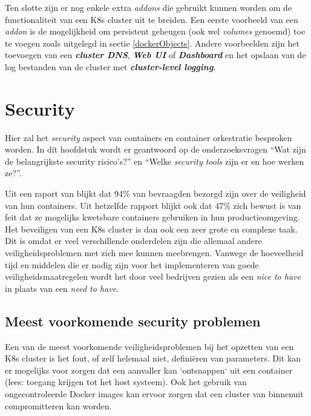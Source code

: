 Ten slotte zijn er nog enkele extra \textit{addons} die gebruikt kunnen worden om de functionaliteit van een K8s cluster uit te breiden. Een eerste voorbeeld van een \textit{addon} is de mogelijkheid om persistent geheugen (ook wel \textit{volumes} genoemd) toe te voegen zoals uitgelegd in sectie \ref{dockerObjects}. Andere voorbeelden zijn het toevoegen van een \textbf{\textit{cluster DNS}}, \textbf{\textit{Web UI}} of \textbf{\textit{Dashboard}} en het opslaan van de log bestanden van de cluster met \textbf{\textit{cluster-level logging}}.
\clearpage

\section{Security}

Hier zal het \textit{security} aspect van containers en container orkestratie besproken worden. In dit hoofdstuk wordt er geantwoord op de onderzoeksvragen ``Wat zijn de belangrijkste security risico's?'' en ``Welke \textit{security tools} zijn er en hoe werken ze?''.

Uit een raport van \textcite{Tripwire2019} blijkt dat 94\% van bevraagden bezorgd zijn over de veiligheid van hun containers. Uit hetzelfde rapport blijkt ook dat 47\% zich bewust is van feit dat ze mogelijks kwetsbare containers gebruiken in hun productieomgeving. Het beveiligen van een K8s cluster is dan ook een zeer grote en complexe taak. Dit is omdat er veel verschillende onderdelen zijn die allemaal andere veiligheidsproblemen met zich mee kunnen meebrengen. Vanwege de hoeveelheid tijd en middelen die er nodig zijn voor het implementeren van goede veiligheidsmaatregelen wordt het door veel bedrijven gezien als een \textit{nice to have} in plaats van een \textit{need to have}.


\subsection{Meest voorkomende security problemen}
Een van de meest voorkomende veiligheidsproblemen bij het opzetten van een K8s cluster is het fout, of zelf helemaal niet, definiëren van parameters. Dit kan er mogelijks voor zorgen dat een aanvaller kan `ontsnappen` uit een container (lees: toegang krijgen tot het host systeem). Ook het gebruik van ongecontroleerde Docker images kan ervoor zorgen dat een cluster van binnenuit compromitteren kan worden.

